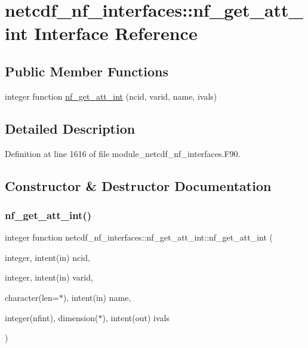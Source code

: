 \hypertarget{interfacenetcdf__nf__interfaces_1_1nf__get__att__int}{}\section{netcdf\+\_\+nf\+\_\+interfaces\+:\+:nf\+\_\+get\+\_\+att\+\_\+int Interface Reference}
\label{interfacenetcdf__nf__interfaces_1_1nf__get__att__int}
\subsection*{Public Member Functions}
\begin{DoxyCompactItemize}
\item 
integer function \hyperlink{interfacenetcdf__nf__interfaces_1_1nf__get__att__int_abf04c3ba5d95b4a1faa747acf991a793}{nf\+\_\+get\+\_\+att\+\_\+int} (ncid, varid, name, ivals)
\end{DoxyCompactItemize}


\subsection{Detailed Description}


Definition at line 1616 of file module\+\_\+netcdf\+\_\+nf\+\_\+interfaces.\+F90.



\subsection{Constructor \& Destructor Documentation}
\mbox{\label{interfacenetcdf__nf__interfaces_1_1nf__get__att__int_abf04c3ba5d95b4a1faa747acf991a793}} 
\subsubsection{\texorpdfstring{nf\+\_\+get\+\_\+att\+\_\+int()}{nf\_get\_att\_int()}}
{\footnotesize\ttfamily integer function netcdf\+\_\+nf\+\_\+interfaces\+::nf\+\_\+get\+\_\+att\+\_\+int\+::nf\+\_\+get\+\_\+att\+\_\+int (\begin{DoxyParamCaption}\item[{integer, intent(in)}]{ncid,  }\item[{integer, intent(in)}]{varid,  }\item[{character(len=$\ast$), intent(in)}]{name,  }\item[{integer(nfint), dimension($\ast$), intent(out)}]{ivals }\end{DoxyParamCaption})}



